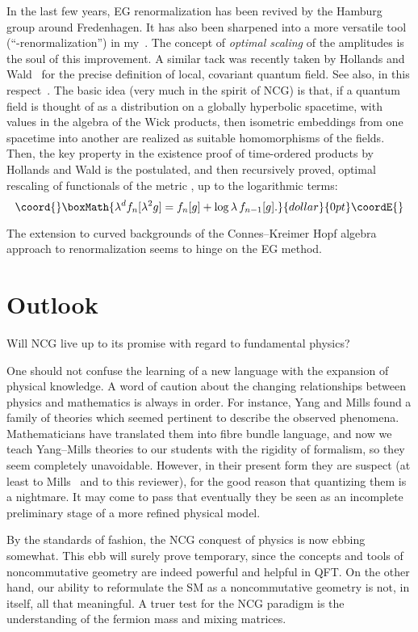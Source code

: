\documentclass[a4paper,12pt]{article}
\providecommand{\la}{\lambda}           %
\providecommand{\1}{\mathbf{1}}         %
\providecommand{\7}{\dagger}            %
\providecommand{\8}{\bullet}            %
\renewcommand{\.}{\cdot}            %
\renewcommand{\:}{\colon}           %
\begin{document}
In the last few years, EG renormalization has been revived by the
Hamburg group around Fredenhagen. It has also been sharpened into a
more versatile tool (``\coordHE{}-renormali\-za\-tion'') in my~\cite{Carme}.
The concept of \textit{optimal scaling} of the amplitudes is the soul
of this improvement. A similar tack was recently taken by Hollands and
Wald~\cite{HollandsW} for the precise definition of local, covariant
quantum field. See also, in this
respect~\cite{BrunettiFV,JunkerS,Grigore}. The basic idea (very much
in the spirit of NCG) is that, if a quantum field is thought of as a
distribution on a globally hyperbolic spacetime, with values in the
algebra of the Wick products, then isometric embeddings from one
spacetime into another are realized as suitable homomorphisms of the
fields. Then, the key property in the existence proof of time-ordered
products by Hollands and Wald is the postulated, and then recursively
proved, optimal rescaling of functionals of the metric \coordHE{}, up to the
logarithmic terms:
$$\coord{}\boxMath{
\la^d f_n[\la^2 g] = f_n[g] + \log\la \,f_{n-1}[g].
}{dollar}{0pt}\coordE{}$$

The extension to curved backgrounds of the Connes--Kreimer Hopf
algebra approach to renormalization seems to hinge on the EG method.



\section{Outlook}

Will NCG live up to its promise with regard to fundamental physics? 

One should not confuse the learning of a new language with the
expansion of physical knowledge. A word of caution about the changing
relationships between physics and mathematics is always in order. For
instance, Yang and Mills found a family of theories which seemed
pertinent to describe the observed phenomena. Mathematicians have
translated them into fibre bundle language, and now we teach
Yang--Mills theories to our students with the rigidity of formalism,
so they seem completely unavoidable. However, in their present form
they are suspect (at least to Mills~\cite{Mills} and to this
reviewer), for the good reason that quantizing them is a nightmare. It
may come to pass that eventually they be seen as an incomplete
preliminary stage of a more refined physical model.

By the standards of fashion, the NCG conquest of physics is now ebbing
somewhat. This ebb will surely prove temporary, since the concepts and
tools of noncommutative geometry are indeed powerful and helpful in
QFT. On the other hand, our ability to reformulate the SM as a
noncommutative geometry is not, in itself, all that meaningful. A
truer test for the NCG paradigm is the understanding of the fermion
mass and mixing matrices.
\end{document}
